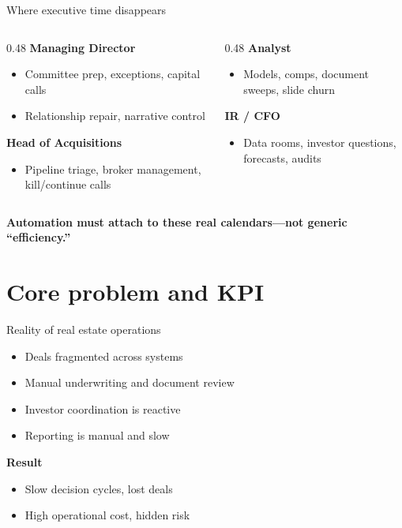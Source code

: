 \documentclass[aspectratio=169,11pt]{beamer}
\begin{document}
\begin{frame}{Where executive time disappears}
  \small
  \begin{columns}[T]
    \begin{column}{0.48\textwidth}
      \textbf{Managing Director}
      \begin{itemize}\itemsep2pt
        \item Committee prep, exceptions, capital calls
        \item Relationship repair, narrative control
      \end{itemize}
      \textbf{Head of Acquisitions}
      \begin{itemize}\itemsep2pt
        \item Pipeline triage, broker management, kill/continue calls
      \end{itemize}
    \end{column}
    \begin{column}{0.48\textwidth}
      \textbf{Analyst}
      \begin{itemize}\itemsep2pt
        \item Models, comps, document sweeps, slide churn
      \end{itemize}
      \textbf{IR / CFO}
      \begin{itemize}\itemsep2pt
        \item Data rooms, investor questions, forecasts, audits
      \end{itemize}
    \end{column}
  \end{columns}
  \vspace{0.5em}
  \centering\textbf{Automation must attach to these real calendars---not generic ``efficiency.''}
\end{frame}

\section{Core problem and KPI}

\begin{frame}{Reality of real estate operations}
  \small
  \begin{itemize}
    \item Deals fragmented across systems
    \item Manual underwriting and document review
    \item Investor coordination is reactive
    \item Reporting is manual and slow
  \end{itemize}
  \vspace{0.5em}
  \textbf{Result}
  \begin{itemize}
    \item Slow decision cycles, lost deals
    \item High operational cost, hidden risk
  \end{itemize}
\end{frame}
\end{document}
